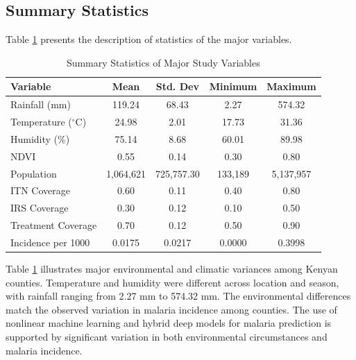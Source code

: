\subsection{Summary Statistics}

Table \ref{tab:summary_stats} presents the description of statistics of the major  variables.

\begin{table}[H]
	\centering
	\caption{Summary Statistics of Major Study Variables}
	\label{tab:summary_stats}
	\begin{tabular}{lcccc}
		\hline
		Variable & Mean & Std. Dev & Minimum & Maximum \\
		\hline
		Rainfall (mm) & 119.24 & 68.43 & 2.27 & 574.32 \\
		Temperature ($^\circ$C) & 24.98 & 2.01 & 17.73 & 31.36 \\
		Humidity (\%) & 75.14 & 8.68 & 60.01 & 89.98 \\
		NDVI & 0.55 & 0.14 & 0.30 & 0.80 \\
		Population & 1,064,621 & 725,757.30 & 133,189 & 5,137,957 \\
		ITN Coverage & 0.60 & 0.11 & 0.40 & 0.80 \\
		IRS Coverage & 0.30 & 0.12 & 0.10 & 0.50 \\
		Treatment Coverage & 0.70 & 0.12 & 0.50 & 0.90 \\
		Incidence per 1000 & 0.0175 & 0.0217 & 0.0000 & 0.3998 \\
		\hline
	\end{tabular}
\end{table}
Table \ref{tab:summary_stats} illustrates major environmental and climatic variances among Kenyan counties. Temperature and humidity were different across location and season, with rainfall ranging from 2.27 mm to 574.32 mm.  The environmental differences match the observed variation in malaria incidence among counties. The use of nonlinear machine learning and hybrid deep models for malaria prediction is supported by significant variation in both environmental circumstances and malaria incidence.
